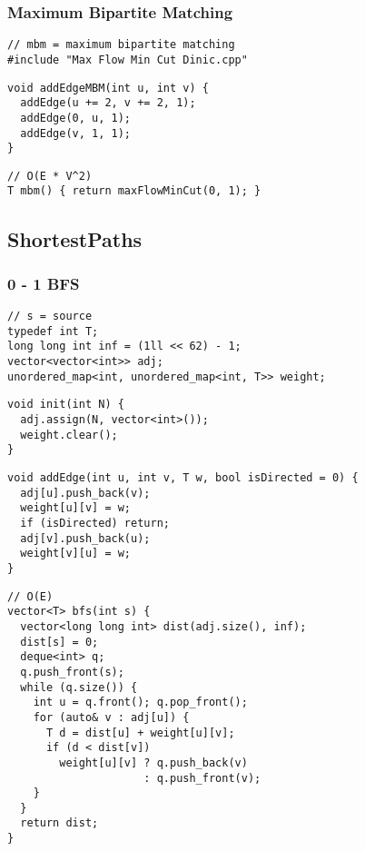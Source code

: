 \documentclass[twoside]{article}
\begin{document}
\begin{multicols*}{2}
\subsubsectionfont{\large\bfseries\sffamily\underline}
\subsubsection*{Maximum Bipartite Matching}
\begin{verbatim}
// mbm = maximum bipartite matching
#include "Max Flow Min Cut Dinic.cpp"
\end{verbatim}
\vspace{-12pt}
\begin{verbatim}
void addEdgeMBM(int u, int v) {
  addEdge(u += 2, v += 2, 1);
  addEdge(0, u, 1);
  addEdge(v, 1, 1);
}
\end{verbatim}
\vspace{-12pt}
\begin{verbatim}
// O(E * V^2)
T mbm() { return maxFlowMinCut(0, 1); }
\end{verbatim}

\subsectionfont{\bfseries\sffamily\centering\LARGE}
\vspace{0em}
\subsection*{ShortestPaths}
\vspace{2em}
\subsubsectionfont{\large\bfseries\sffamily\underline}
\subsubsection*{0 - 1 BFS}
\begin{verbatim}
// s = source
typedef int T;
long long int inf = (1ll << 62) - 1;
vector<vector<int>> adj;
unordered_map<int, unordered_map<int, T>> weight;
\end{verbatim}
\vspace{-12pt}
\begin{verbatim}
void init(int N) {
  adj.assign(N, vector<int>());
  weight.clear();
}
\end{verbatim}
\vspace{-12pt}
\begin{verbatim}
void addEdge(int u, int v, T w, bool isDirected = 0) {
  adj[u].push_back(v);
  weight[u][v] = w;
  if (isDirected) return;
  adj[v].push_back(u);
  weight[v][u] = w;
}
\end{verbatim}
\vspace{-12pt}
\begin{verbatim}
// O(E)
vector<T> bfs(int s) {
  vector<long long int> dist(adj.size(), inf);
  dist[s] = 0;
  deque<int> q;
  q.push_front(s);
  while (q.size()) {
    int u = q.front(); q.pop_front();
    for (auto& v : adj[u]) {
      T d = dist[u] + weight[u][v];
      if (d < dist[v])
        weight[u][v] ? q.push_back(v)
                     : q.push_front(v);
    }
  }
  return dist;
}
\end{verbatim}


\end{multicols*}
\end{document}
